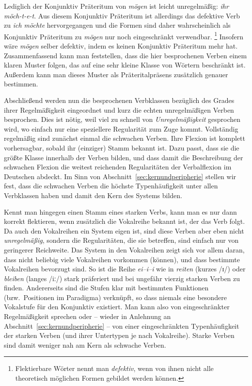 Lediglich der Konjunktiv Präteritum von \textit{mögen} ist leicht unregelmäßig: \textit{ihr möch-t-e-t}.
Aus diesem Konjunktiv Präteritum ist allerdings das defektive Verb zu \textit{ich möchte} hervorgegangen und die Formen sind daher wahrscheinlich als Konjunktiv Präteritum zu \textit{mögen} nur noch eingeschränkt verwendbar.%
\footnote{Flektierbare Wörter nennt man \textit{defektiv}, wenn von ihnen nicht alle theoretisch möglichen Formen gebildet werden können.}
Insofern wäre \textit{mögen} selber defektiv, indem es keinen Konjunktiv Präteritum mehr hat.
Zusammenfassend kann man feststellen, dass die hier besprochenen Verben einem klaren Muster folgen, das auf eine sehr kleine Klasse von Wörtern beschränkt ist.
Außerdem kann man dieses Muster als Präteritalpräsens zusätzlich genauer bestimmen.


Abschließend werden nun die besprochenen Verbklassen bezüglich des Grades ihrer Regelmäßigkeit eingeordnet und kurz die echten unregelmäßigen Verben besprochen.
Dies ist nötig, weil viel zu schnell von \textit{Unregelmäßigkeit} gesprochen wird, wo einfach nur eine speziellere Regularität zum Zuge kommt.
Vollständig regelmäßig sind zunächst einmal die schwachen Verben.
Ihre Flexion ist komplett vorhersagbar, sobald ihr (einziger) Stamm bekannt ist.
Dazu passt, dass sie die größte Klasse innerhalb der Verben bilden, und dass damit die Beschreibung der schwachen Flexion die weitest reichenden Regularitäten der Verbalflexion im Deutschen abdeckt.
Im Sinn von Abschnitt~\ref{sec:kernundperipherie} stellen wir fest, dass die schwachen Verben die höchste Typenhäufigkeit unter allen Verbklassen haben und damit den Kern des Systems bilden.

Kennt man hingegen einen Stamm eines starken Verbs, kann man es nur dann korrekt flektieren, wenn zusätzlich die Vokalreihe bekannt ist, der das Verb folgt.
Da auch den Vokalreihen ein System eigen ist, sind diese Verben aber eben nicht \textit{unregelmäßig}, sondern die Regularitäten, die sie betreffen, sind einfach nur von geringerer Reichweite.
Das System in den Vokalreihen zeigt sich vor allem daran, dass nicht beliebig viele Vokalreihen vorkommen (können), und dass bestimmte Vokalreihen bevorzugt sind.
So ist \zB die Reihe \textit{ei--i--i} wie in \textit{reiten} (kurzes /ɪ/) oder \textit{bleiben} (langes /iː/) stark präferiert und bei ungefähr vierzig starken Verben zu finden.
Andererseits sind die Stufen klar mit bestimmten Funktionen (bzw.\ Positionen im Paradigma) verknüpft, so dass \zB niemals eine besondere Vokalstufe für den Konjunktiv existiert.
Man kann also von eingeschränkter Regelmäßigkeit sprechen oder -- wieder in Anlehnung an Abschnitt~\ref{sec:kernundperipherie} -- von einer eingeschränkten Typenhäufigkeit der starken Verben (und ihrer Untertypen je nach Vokalreihe).
Starke Verben sind damit weniger nah am Kern als schwache Verben.

